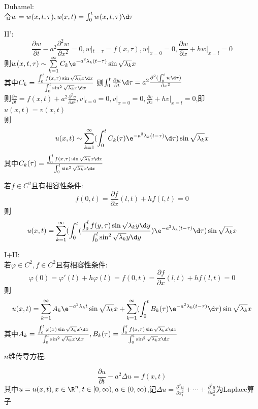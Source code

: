 \begin{jie}
Duhamel:\\
令$w=w(x,t,\tau),u(x,t)=\int_{0}^{t}w(x,t,\tau)\d\tau$

\rm{II}':
\[\frac{\partial w}{\partial t}-a^2\frac{\partial^2 w}{\partial x^2}=0,w|_{t=\tau}=f(x,\tau),w|_{x=0}=0,\frac{\partial w}{\partial x}+h w|_{x=l}=0\]
则$w(x,t,\tau)\sim \sum\limits_{k=1}^{\infty}C_k\e^{-a^2\lambda_k (t-\tau)}\sin\sqrt{\lambda_k}x$\\
其中$C_{k}=\frac{\int_{0}^{l}f(x,\tau)\sin\sqrt{\lambda_k}x\d x}{\int_{0}^{l}\sin^2\sqrt{\lambda_k}x\d x}$
则$\int_{0}^{t}\frac{\partial w}{\partial t}\d\tau=a^2\frac{\partial^2(\int_{0}^{t}w\d\tau)}{\partial x^2}$\\
则$\frac{\partial v}{\partial t}=f(x,t)+a^2\frac{\partial^2v}{\partial x^2},v|_{t=0}=0,v|_{x=0}=0,\frac{\partial v}{\partial x}+h v|_{x=l}=0$,即$u(x,t)=v(x,t)$\\
则\[u(x,t)\sim \sum\limits_{k=1}^{\infty}(\int_{0}^{t}C_k(\tau)\e^{-a^2\lambda_k (t-\tau)}\d\tau)\sin\sqrt{\lambda_k}x\]
其中$C_{k}(\tau)=\frac{\int_{0}^{l}f(x,\tau)\sin\sqrt{\lambda_k}x\d x}{\int_{0}^{l}\sin^2\sqrt{\lambda_k}x\d x}$
\end{jie}

\begin{dingli*}
若$f\in C^2$且有相容性条件:
\[f(0,t)=\frac{\partial f}{\partial x}(l,t)+hf(l,t)=0\]
则\[u(x,t)=\sum\limits_{k=1}^{\infty}(\int_{0}^{t}(\frac{\int_{0}^{l}f(y,\tau)\sin\sqrt{\lambda_k}y\d y}{\int_{0}^{l}\sin^2\sqrt{\lambda_k}y\d y})\e^{-a^2\lambda_k (t-\tau)}\d\tau)\sin\sqrt{\lambda_k}x\]
\end{dingli*}

I+II:\\
若$\varphi\in C^2,f\in C^2$且有相容性条件:
\[\varphi(0)=\varphi'(l)+h\varphi(l)=f(0,t)=\frac{\partial f}{\partial x}(l,t)+hf(l,t)=0\]
则\[u(x,t)=\sum\limits_{k=1}^{\infty}A_k\e^{-a^2\lambda_k t}\sin\sqrt{\lambda_k}x+\sum\limits_{k=1}^{\infty}(\int_{0}^{t}B_k(\tau)\e^{-a^2\lambda_k (t-\tau)}\d\tau)\sin\sqrt{\lambda_k}x\]
其中$A_{k}=\frac{\int_{0}^{l}\varphi(x)\sin\sqrt{\lambda_k}x\d x}{\int_{0}^{l}\sin^2\sqrt{\lambda_k}x\d x},B_{k}(\tau)=\frac{\int_{0}^{l}f(x,\tau)\sin\sqrt{\lambda_k}x\d x}{\int_{0}^{l}\sin^2\sqrt{\lambda_k}x\d x}$

$n$维传导方程:

\[\frac{\partial u}{\partial t}-a^2\Delta u=f(x,t)\]
其中$u=u(x,t),x\in\R^n,t\in [0,\infty),a\in(0,\infty)$,记$\Delta u=\frac{\partial^2u}{\partial x_1^2}+\cdots+\frac{\partial^2u}{\partial x_n^2}$为Laplace算子\\

